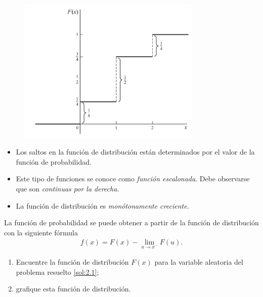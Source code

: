 \begin{figure}
	\centering
	\includegraphics[height=7cm,keepaspectratio=true]{./pe/pands0201.png}
	\label{fig:0201}
\end{figure}



\begin{observacion}
	\begin{itemize}
		\item Los saltos en la función de distribución están determinados por el valor de la función de probabilidad. 
		\item Este tipo de funciones se conoce como \emph{función escalonada}.  Debe observarse que son \emph{continuas por la derecha.}
		\item La función de distribución es \emph{monótonamente creciente.}
	\end{itemize}
	
\end{observacion}



La función de probabilidad se puede obtener a partir de la función de distribución con la siguiente fórmula
\begin{align}
	\label{2.6}
	f(x)=F(x)-\lim_{u \to x^{-}}F(u).
\end{align}



\begin{ejemplo}
	\label{sol:2.3}
	\begin{enumerate}
		\item Encuentre la función de distribución $F(x)$ para la variable aleatoria del problema resuelto \ref{sol:2.1};
		\item grafique esta función de distribución.
	\end{enumerate}
	
\end{ejemplo}



